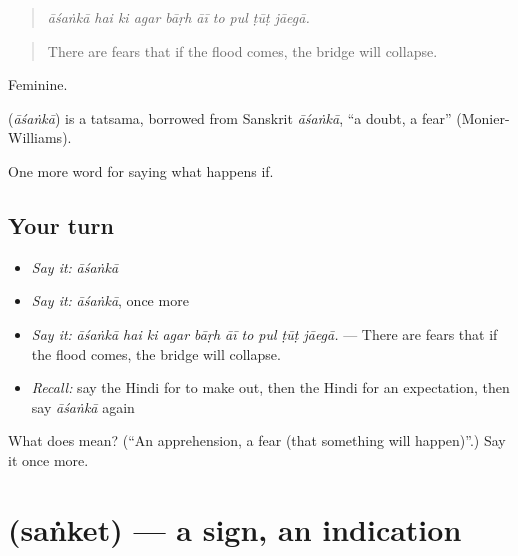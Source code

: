 \begin{quote}
         
\end{quote}

\begin{quote}
\emph{āśaṅkā hai ki agar bāṛh āī to pul ṭūṭ jāegā.}
\end{quote}

\begin{quote}
There are fears that if the flood comes, the bridge will collapse.
\end{quote}

Feminine.

\begin{cousinweb}
\textbf{} (\emph{āśaṅkā}) is a tatsama, borrowed from Sanskrit \emph{āśaṅkā}, \textquotedblleft{}a doubt, a fear\textquotedblright{} (Monier-Williams).
\end{cousinweb}

\begin{grammarlens}[title={What you've built}]
One more word for saying what happens if.
\end{grammarlens}

\subsection*{Your turn}
\begin{itemize}
\raggedright
  \item \emph{Say it:} \emph{āśaṅkā}
  \item \emph{Say it:} \emph{āśaṅkā}, once more
  \item \emph{Say it:} \emph{āśaṅkā hai ki agar bāṛh āī to pul ṭūṭ jāegā.} — There are fears that if the flood comes, the bridge will collapse.
  \item \emph{Recall:} say the Hindi for to make out, then the Hindi for an expectation, then say \emph{āśaṅkā} again
\end{itemize}

\begin{tcolorbox}[breakable,colback=teal!4,colframe=teal!35!black,title={Before you move on}]
What does  mean? (\textquotedblleft{}An apprehension, a fear (that something will happen)\textquotedblright{}.) Say it once more.
\end{tcolorbox}
\section[\texorpdfstring{\hi{संकेत} (saṅket)}{संकेत (saṅket)}]{ (saṅket) — a sign, an indication}

